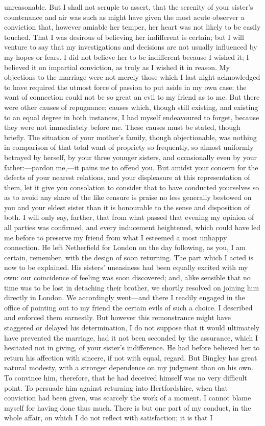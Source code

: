 unreasonable. But I shall not scruple to assert, that the serenity of your sister's countenance and air was such as might have given the most acute observer a conviction that, however amiable her temper, her heart was not likely to be easily touched. That I was desirous of believing her indifferent is certain; but I will venture to say that my investigations and decisions are not usually influenced by my hopes or fears. I did not believe her to be indifferent because I wished it; I believed it on impartial conviction, as truly as I wished it in reason. My objections to the marriage were not merely those which I last night acknowledged to have required the utmost force of passion to put aside in my own case; the want of connection could not be so great an evil to my friend as to me. But there were other causes of repugnance; causes which, though still existing, and existing to an equal degree in both instances, I had myself endeavoured to forget, because they were not immediately before me. These causes must be stated, though briefly. The situation of your mother's family, though objectionable, was nothing in comparison of that total want of propriety so frequently, so almost uniformly betrayed by herself, by your three younger sisters, and occasionally even by your father:—pardon me,—it pains me to offend you. But amidst your concern for the defects of your nearest relations, and your displeasure at this representation of them, let it give you consolation to consider that to have conducted yourselves so as to avoid any share of the like censure is praise no less generally bestowed on you and your eldest sister than it is honourable to the sense and disposition of both. I will only say, farther, that from what passed that evening my opinion of all parties was confirmed, and every inducement heightened, which could have led me before to preserve my friend from what I esteemed a most unhappy connection. He left Netherfield for London on the day following, as you, I am certain, remember, with the design of soon returning. The part which I acted is now to be explained. His sisters' uneasiness had been equally excited with my own: our coincidence of feeling was soon discovered; and, alike sensible that no time was to be lost in detaching their brother, we shortly resolved on joining him directly in London. We accordingly went—and there I readily engaged in the office of pointing out to my friend the certain evils of such a choice. I described and enforced them earnestly. But however this remonstrance might have staggered or delayed his determination, I do not suppose that it would ultimately have prevented the marriage, had it not been seconded by the assurance, which I hesitated not in giving, of your sister's indifference. He had before believed her to return his affection with sincere, if not with equal, regard. But Bingley has great natural modesty, with a stronger dependence on my judgment than on his own. To convince him, therefore, that he had deceived himself was no very difficult point. To persuade him against returning into Hertfordshire, when that conviction had been given, was scarcely the work of a moment. I cannot blame myself for having done thus much. There is but one part of my conduct, in the whole affair, on which I do not reflect with satisfaction; it is that I 